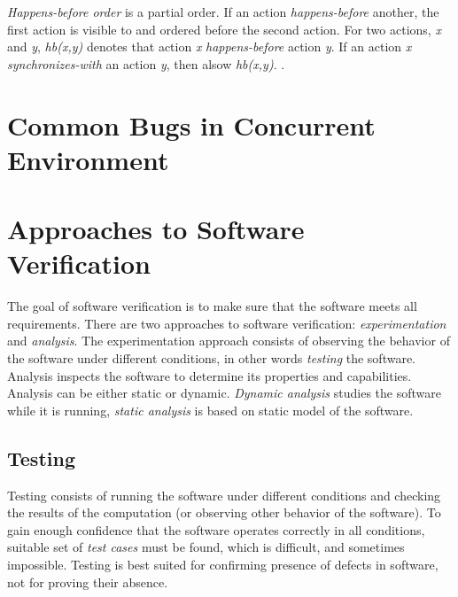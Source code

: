 \emph{Happens-before order} is a partial order. If an action
\emph{happens-before} another, the first action is visible to and ordered before
the second action. For two actions, \emph{x} and \emph{y}, \emph{hb(x,y)}
denotes that action \emph{x} \emph{happens-before} action \emph{y}. If an action
\emph{x} \emph{synchronizes-with} an action \emph{y}, then alsow \emph{hb(x,y)}.
\todo{}.

\section{Common Bugs in Concurrent Environment}



\section{Approaches to Software Verification}


The goal of software verification is to make sure that the software meets all
requirements. There are two approaches to software verification:
\emph{experimentation} and \emph{analysis}. The experimentation approach
consists of observing the behavior of the software under different conditions,
in other words \emph{testing} the software. Analysis inspects the software to
determine its properties and capabilities. Analysis can be either static or
dynamic. \emph{Dynamic analysis} studies the software while it is running,
\emph{static analysis} is based on static model of the software.

\subsection{Testing}

Testing consists of running the software under different conditions and
checking the results of the computation (or observing other behavior of the
software). To gain enough confidence that the software operates correctly in all
conditions, suitable set of \emph{test cases} must be found, which is difficult,
and sometimes impossible. Testing is best suited for confirming presence of
defects in software, not for proving their absence.

